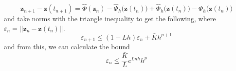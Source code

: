     \begin{equation}
      \mathbf{z}_{n+1} - \mathbf{z}(t_{n+1}) = \hat{\Phi}(\mathbf{z}_n) - \hat{\Phi}_h \big(\mathbf{z}(t_n)\big) + \hat{\Phi}_h \big(\mathbf{z}(t_n)\big) - \Phi_h \big(\mathbf{z}(t_n) \big)
    \end{equation}
    and take norms with the triangle inequality to get the following, where $\varepsilon_n = ||\mathbf{z}_n - \mathbf{z}(t_n)||$. 
    \begin{equation}
      \varepsilon_{n+1} \leq (1 + L h) \varepsilon_n + \bar{K} h^{p+1}
    \end{equation}
    and from this, we can calculate the bound 
    \begin{equation}
      \varepsilon_n \leq \frac{\bar{K}}{L} e^{L n h} h^p
    \end{equation}

